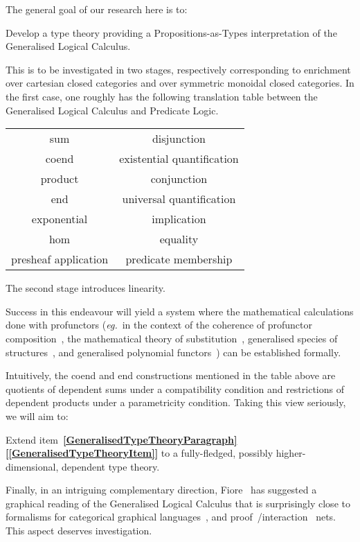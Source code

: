 \documentclass[11pt,twocolumn]{article}
\newcounter{CC}
\newenvironment{resenumerate}
  {\begin{list}{[\textbf{\arabic{CC}]}}
  {\usecounter{CC}
   \setlength{\topsep}{2pt}
   \setlength{\partopsep}{2pt}
   \setlength{\itemsep}{2.5pt}
   \setlength{\parsep}{2.5pt}
   \setlength{\leftmargin}{1.65em}
   \setlength{\labelwidth}{1.15em}
 }}
  {\end{list}}
\newcommand{\itemref}[1]{\textbf{[\ref{#1}]}}
\newcommand{\eg}{\emph{eg.}}
\begin{document}
The general goal of our research here is to:
\begin{resenumerate}\setcounter{CC}{0}
\item\label{GeneralisedTypeTheoryItem}
   Develop a type theory providing a Propositions-as-Types interpretation of
   the Generalised Logical Calculus.
\end{resenumerate}
This is to be investigated in two stages, respectively corresponding to
enrichment over cartesian closed categories and over symmetric monoidal
closed categories.  In the first case, one roughly has the following
translation table between the Generalised Logical Calculus and Predicate
Logic.
\begin{center}\begin{tabular}{|c|c|}\hline
  sum & disjunction\\ 
  coend & existential quantification\\ 
  product & conjunction\\ 
  end & universal quantification\\ 
  exponential & implication\\ 
  hom & equality\\ 
  presheaf application & predicate membership\\
  \hline
\end{tabular}\end{center}
The second stage introduces linearity. 

Success in this endeavour will yield a system where the mathematical
calculations done with profunctors (\eg~in the context of the coherence of
profunctor composition~\cite{Benabou}, the mathematical theory of
substitution~\cite{FioreFossacs}, generalised species of
structures~\cite{Species}, and generalised polynomial
functors~\cite{FioreICALP}) can be established formally.

Intuitively, the coend and end constructions mentioned in the table above are
quotients of dependent sums under a compatibility condition and restrictions
of dependent products under a parametricity condition.  Taking this view
seriously, we will aim to:
\begin{resenumerate}\setcounter{CC}{1}
\item
  Extend
  item~\textbf{\ref{GeneralisedTypeTheoryParagraph}}\thinspace\itemref{GeneralisedTypeTheoryItem}
  to a fully-fledged, possibly higher-dimensional, dependent type theory.  
\end{resenumerate}

Finally, in an intriguing complementary direction,
Fiore~\cite{FioreFossacs} has suggested a graphical reading of the
Generalised Logical Calculus that is surprisingly close to formalisms for
categorical graphical languages~\cite{Selinger}, and
proof~\cite{GirardLinearLogic}/interaction~\cite{Lafont} nets.  This
aspect deserves investigation.
\end{document}
